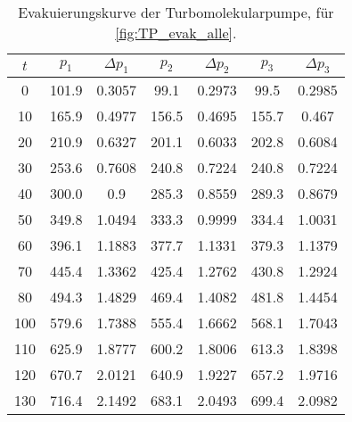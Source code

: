 \begin{table}[H]
    \centering
    \caption{Evakuierungskurve der Turbomolekularpumpe, für  \autoref{fig:TP_evak_alle}.}
    \label{tab:TP_evak_alle}
    \begin{tabular}{c c c c c c c}
        \toprule
        {$t$} & {$p_1$} & {$\Delta p_1$} & {$p_2$} & {$\Delta p_2$} & {$p_3$} & {$\Delta p_3$} \\
        \midrule
        0 & 101.9 & 0.3057 & 99.1 & 0.2973 & 99.5 & 0.2985     \\
        10 & 165.9 & 0.4977 & 156.5 & 0.4695 & 155.7 & 0.467   \\
        20 & 210.9 & 0.6327 & 201.1 & 0.6033 & 202.8 & 0.6084  \\
        30 & 253.6 & 0.7608 & 240.8 & 0.7224 & 240.8 & 0.7224  \\
        40 & 300.0 & 0.9 & 285.3 & 0.8559 & 289.3 & 0.8679     \\
        50 & 349.8 & 1.0494 & 333.3 & 0.9999 & 334.4 & 1.0031  \\
        60 & 396.1 & 1.1883 & 377.7 & 1.1331 & 379.3 & 1.1379  \\
        70 & 445.4 & 1.3362 & 425.4 & 1.2762 & 430.8 & 1.2924  \\
        80 & 494.3 & 1.4829 & 469.4 & 1.4082 & 481.8 & 1.4454  \\
        100 & 579.6 & 1.7388 & 555.4 & 1.6662 & 568.1 & 1.7043 \\
        110 & 625.9 & 1.8777 & 600.2 & 1.8006 & 613.3 & 1.8398 \\
        120 & 670.7 & 2.0121 & 640.9 & 1.9227 & 657.2 & 1.9716 \\
        130 & 716.4 & 2.1492 & 683.1 & 2.0493 & 699.4 & 2.0982 \\
        \bottomrule
    \end{tabular}
\end{table}

